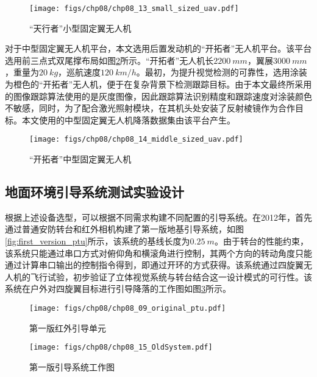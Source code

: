 \begin{figure}[!ht]
	\centering
	\texttt{[image: figs/chp08/chp08\_13\_small\_sized\_uav.pdf]}	
	\caption{“天行者”小型固定翼无人机}
	\label{fig:chp08_13_small_sized_uav}
\end{figure}

对于中型固定翼无人机平台，本文选用后置发动机的“开拓者”无人机平台。该平台选用前三点式双尾撑布局如图\ref{fig:chp08_14_middle_sized_uav}所示。“开拓者”无人机长$2200\ mm$，翼展$3000\ mm$，重量为$20\ kg$，巡航速度$120\ km/h$。最初，为提升视觉检测的可靠性，选用涂装为橙色的“开拓者”无人机，便于在复杂背景下检测跟踪目标。由于本文最终所采用的图像跟踪算法使用的是灰度图像，因此跟踪算法识别精度和跟踪速度对涂装颜色不敏感，同时，为了配合激光照射模块，在其机头处安装了反射棱镜作为合作目标。本文使用的中型固定翼无人机降落数据集由该平台产生。

\begin{figure}[!ht]
	\centering
	\texttt{[image: figs/chp08/chp08\_14\_middle\_sized\_uav.pdf]}	
	\caption{“开拓者”中型固定翼无人机}
	\label{fig:chp08_14_middle_sized_uav}
\end{figure}


\subsection{地面环境引导系统测试实验设计}
根据上述设备选型，可以根据不同需求构建不同配置的引导系统。在2012年，首先通过普通安防转台和红外相机构建了第一版地基引导系统，如图\ref{fig:first_version_ptu}所示，该系统的基线长度为$0.25\ m$。由于转台的性能约束，该系统只能通过串口方式对俯仰角和横滚角进行控制，其两个方向的转动角度只能通过计算串口输出的控制指令得到，即通过开环的方式获得。该系统通过四旋翼无人机的飞行试验，初步验证了立体视觉系统与转台结合这一设计模式的可行性。该系统在户外对四旋翼目标进行引导降落的工作图如图\ref{fig:first_version_ptu_2}所示。

\begin{figure}[!t]
	\begin{minipage}{0.5\textwidth}
		\centering
		\texttt{[image: figs/chp08/chp08\_09\_original\_ptu.pdf]}	
		\caption{第一版红外引导单元}
		\label{fig:first_version_ptu}
	\end{minipage}\hfill
	\begin{minipage}{0.5\textwidth}
		\centering
		\texttt{[image: figs/chp08/chp08\_15\_OldSystem.pdf]}	
		\caption{第一版引导系统工作图}
		\label{fig:first_version_ptu_2}
	\end{minipage}
\end{figure}


